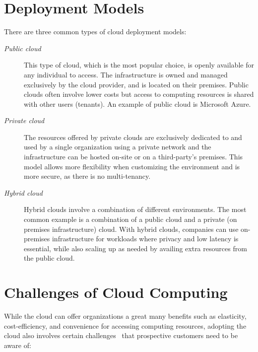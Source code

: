 \section{Deployment Models}
There are three common types of cloud deployment models: ~\cite{nist,c2,PvsH}
\begin{description}
    \item [\textit{Public cloud}] This type of cloud, which is the most popular choice, is openly available for any individual to access. The infrastructure is owned and managed exclusively by the cloud provider, and is located on their premises. Public clouds often involve lower costs but access to computing resources is shared with other users (tenants). An example of public cloud is Microsoft Azure.

    \item [\textit{Private cloud}] The resources offered by private clouds are exclusively dedicated to and used by a single organization using a private network and the infrastructure can be hosted on-site or on a third-party's premises. This model allows more flexibility when customizing the environment and is more secure, as there is no multi-tenancy.

    \item [\textit{Hybrid cloud}] Hybrid clouds involve a combination of different environments. The most common example is a combination of a public cloud and a private (on premises infrastructure) cloud. With hybrid clouds, companies can use on-premises infrastructure for workloads where privacy and low latency is essential, while also scaling up as needed by availing extra resources from the public cloud.
\end{description}


\section{Challenges of Cloud Computing}
While the cloud can offer organizations a great many benefits such as elasticity, cost-efficiency, and convenience for accessing computing resources, adopting the cloud also involves certain challenges~\cite{c2,armbrust} that prospective customers need to be aware of:

